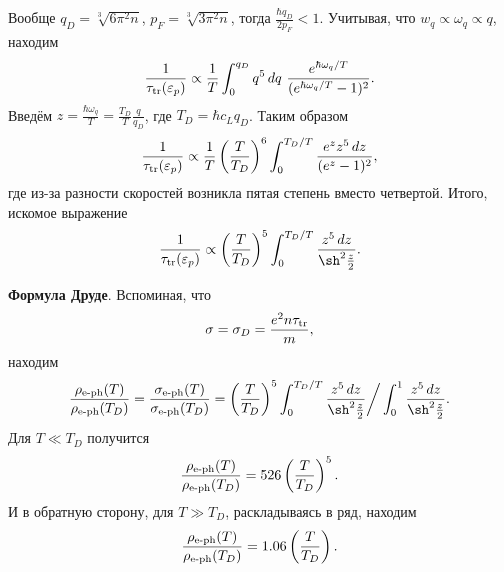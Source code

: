 Вообще $q_D = \sqrt[3]{6 \pi^2 n}$, $p_F = \sqrt[3]{3 \pi^2 n}$, тогда $\frac{\hbar q_D}{2 p_F} < 1$. Учитывая, что $w_q \propto \omega_q \propto q$, находим
\begin{equation*}
	\frac{1}{\tau_{\textnormal{tr}}(\varepsilon_p)} \propto \frac{1}{T} \int_{0}^{q_D} q^5 \, d q \ \frac{e^{\hbar \omega_q/T}}{(e^{\hbar \omega_q/T}-1)^2}. 
\end{equation*}
Введём $z = \frac{\hbar \omega_q}{T} = \frac{T_D}{T} \frac{q}{q_D}$, где $T_D = \hbar c_L q_D$. Таким образом 
\begin{equation*}
	\frac{1}{\tau_{\textnormal{tr}}(\varepsilon_p)} \propto \frac{1}{T} \left(
		\frac{T}{T_D}
	\right)^6 \int_{0}^{T_D/T} \frac{e^z z^5 \, d z}{(e^z-1)^2},
\end{equation*}
где из-за разности скоростей возникла пятая степень вместо четвертой. Итого, искомое выражение 
\begin{equation}
	\frac{1}{\sub{\tau}{tr}(\varepsilon_p)} \propto \left(\frac{T}{T_D}\right)^5 \int_{0}^{T_D/T} \frac{z^5 \d z}{\sh^2 \frac{z}{2}}.
\end{equation}


\textbf{Формула Друде}. Вспоминая, что
\begin{equation*}
	\sigma = \sigma_D = \frac{e^2 n \tau_{\textnormal{tr}}}{m},
\end{equation*}
находим 
\begin{equation*}
	\frac{\sub{\rho}{e-ph}(T)}{\sub{\rho}{e-ph}(T_D)} = \frac{\sub{\sigma}{e-ph}(T)}{\sub{\sigma}{e-ph}(T_D)} = \left(\frac{T}{T_D}\right)^5 \int_{0}^{T_D/T} \frac{z^5 \d z}{\sh^2 \frac{z}{2}} \bigg/ \int_{0}^{1} \frac{z^5 \d z}{\sh^2 \frac{z}{2}}.
\end{equation*}
Для $T \ll T_D$ получится
\begin{equation*}
	\frac{\rho_{\textnormal{e-ph}}(T)}{\rho_{\textnormal{e-ph}}(T_D)} = 526 \left(\frac{T}{T_D}\right)^5.
\end{equation*}
И в обратную сторону, для $T \gg T_D$, раскладываясь в ряд, находим
\begin{equation*}
	\frac{\rho_{\textnormal{e-ph}}(T)}{\rho_{\textnormal{e-ph}}(T_D)} = 1.06 \left(\frac{T}{T_D}\right).
\end{equation*}

